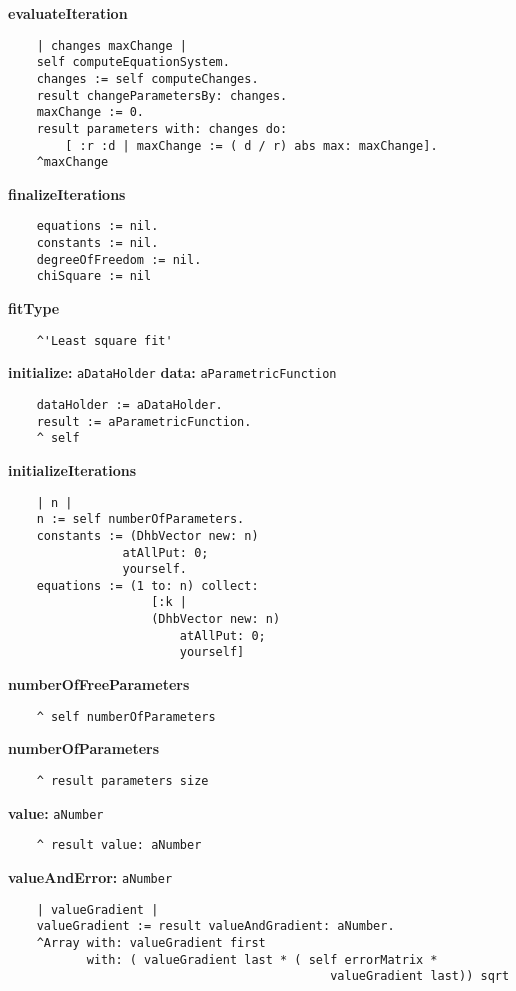 {\bf evaluateIteration}
\begin{verbatim}
    | changes maxChange |
    self computeEquationSystem.
    changes := self computeChanges.
    result changeParametersBy: changes.
    maxChange := 0.
    result parameters with: changes do: 
        [ :r :d | maxChange := ( d / r) abs max: maxChange].
    ^maxChange
\end{verbatim}
{\bf finalizeIterations}
\begin{verbatim}
    equations := nil.
    constants := nil.
    degreeOfFreedom := nil.
    chiSquare := nil
\end{verbatim}
{\bf fitType}
\begin{verbatim}
    ^'Least square fit'
\end{verbatim}
{\bf initialize:} {\tt aDataHolder} {\bf data:} {\tt aParametricFunction}
\begin{verbatim}
    dataHolder := aDataHolder.
    result := aParametricFunction.
    ^ self
\end{verbatim}
{\bf initializeIterations}
\begin{verbatim}
    | n |
    n := self numberOfParameters.
    constants := (DhbVector new: n)
                atAllPut: 0;
                yourself.
    equations := (1 to: n) collect: 
                    [:k | 
                    (DhbVector new: n)
                        atAllPut: 0;
                        yourself]
\end{verbatim}
{\bf numberOfFreeParameters}
\begin{verbatim}
    ^ self numberOfParameters
\end{verbatim}
{\bf numberOfParameters}
\begin{verbatim}
    ^ result parameters size
\end{verbatim}
{\bf value:} {\tt aNumber}
\begin{verbatim}
    ^ result value: aNumber
\end{verbatim}
{\bf valueAndError:} {\tt aNumber}
\begin{verbatim}
    | valueGradient |
    valueGradient := result valueAndGradient: aNumber.
    ^Array with: valueGradient first
           with: ( valueGradient last * ( self errorMatrix * 
                                             valueGradient last)) sqrt
\end{verbatim}

